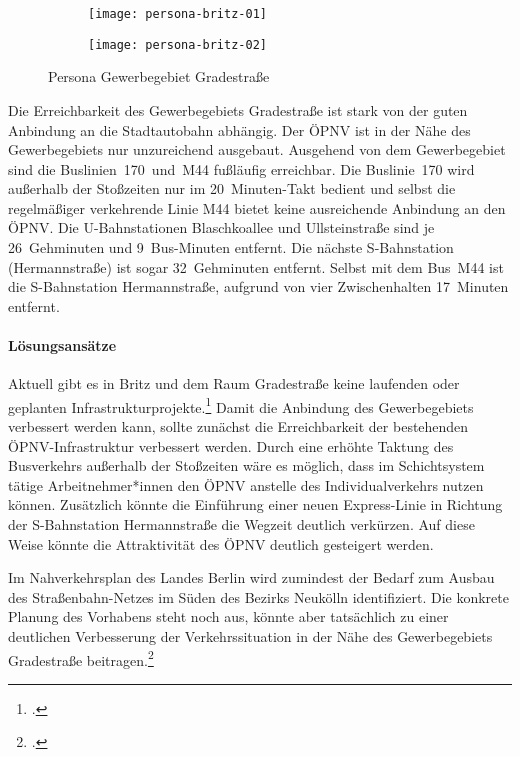 \begin{figure}
    \centering
    \begin{subfigure}{.5\textwidth}
        \centering
        \texttt{[image: persona-britz-01]}
    \end{subfigure}%
    \begin{subfigure}{.5\textwidth}
        \centering
        \texttt{[image: persona-britz-02]}
    \end{subfigure}
    \caption{Persona Gewerbegebiet Gradestraße}
    \label{persona-britz}
\end{figure}

Die Erreichbarkeit des Gewerbegebiets Gradestraße ist stark von der guten Anbindung an die Stadtautobahn abhängig. Der ÖPNV ist in der Nähe des Gewerbegebiets nur unzureichend ausgebaut. Ausgehend von dem Gewerbegebiet sind die Buslinien~170~und~M44 fußläufig erreichbar. Die Buslinie~170 wird außerhalb der Stoßzeiten nur im 20~Minuten-Takt bedient und selbst die regelmäßiger verkehrende Linie M44 bietet keine ausreichende Anbindung an den ÖPNV. Die U-Bahnstationen Blaschkoallee und Ullsteinstraße sind je 26~Gehminuten und 9~Bus-Minuten entfernt. Die nächste S-Bahnstation (Hermannstraße) ist sogar 32~Gehminuten entfernt. Selbst mit dem Bus~M44 ist die S-Bahnstation Hermannstraße, aufgrund von vier Zwischenhalten 17~Minuten entfernt.

\paragraph{Lösungsansätze}

Aktuell gibt es in Britz und dem Raum Gradestraße keine laufenden oder geplanten Infrastrukturprojekte.\footcite{NahverkehrsplanBerlin} Damit die Anbindung des Gewerbegebiets verbessert werden kann, sollte zunächst die Erreichbarkeit der bestehenden ÖPNV-Infrastruktur verbessert werden. Durch eine erhöhte Taktung des Busverkehrs außerhalb der Stoßzeiten wäre es möglich, dass im Schichtsystem tätige Arbeitnehmer*innen den ÖPNV anstelle des Individualverkehrs nutzen können. Zusätzlich könnte die Einführung einer neuen Express-Linie in Richtung der S-Bahnstation Hermannstraße die Wegzeit deutlich verkürzen. Auf diese Weise könnte die Attraktivität des ÖPNV deutlich gesteigert werden.

Im Nahverkehrsplan des Landes Berlin wird zumindest der Bedarf zum Ausbau des Straßenbahn-Netzes im Süden des Bezirks Neukölln identifiziert. Die konkrete Planung des Vorhabens steht noch aus, könnte aber tatsächlich zu einer deutlichen Verbesserung der Verkehrssituation in der Nähe des Gewerbegebiets Gradestraße beitragen.\footcite{NahverkehrsplanBerlin}
